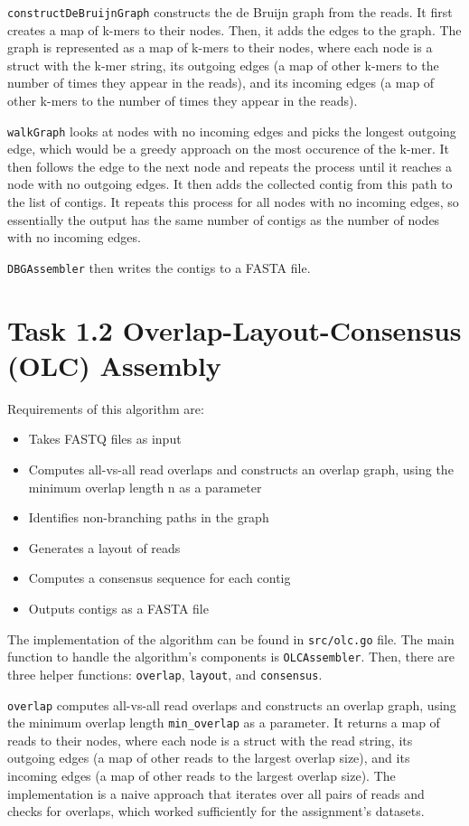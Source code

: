 \documentclass[12pt]{article}
\begin{document}
\texttt{constructDeBruijnGraph} constructs the de Bruijn graph from the reads. It first creates a map of k-mers to their nodes. Then, it adds the edges to the graph. The graph is represented as a map of k-mers to their nodes, where each node is a struct with the k-mer string, its outgoing edges (a map of other k-mers to the number of times they appear in the reads), and its incoming edges (a map of other k-mers to the number of times they appear in the reads).

\texttt{walkGraph} looks at nodes with no incoming edges and picks the longest outgoing edge, which would be a greedy approach on the most occurence of the k-mer. It then follows the edge to the next node and repeats the process until it reaches a node with no outgoing edges. It then adds the collected contig from this path to the list of contigs. It repeats this process for all nodes with no incoming edges, so essentially the output has the same number of contigs as the number of nodes with no incoming edges.

\texttt{DBGAssembler} then writes the contigs to a FASTA file.

\section{Task 1.2 Overlap-Layout-Consensus (OLC) Assembly}

Requirements of this algorithm are:
\begin{itemize}
    \item Takes FASTQ files as input
    \item Computes all-vs-all read overlaps and constructs an overlap graph,
    using the minimum overlap length n as a parameter
    \item Identifies non-branching paths in the graph
    \item Generates a layout of reads
    \item Computes a consensus sequence for each contig
    \item Outputs contigs as a FASTA file
\end{itemize}

The implementation of the algorithm can be found in \texttt{src/olc.go} file. The main function to handle the algorithm's components is \texttt{OLCAssembler}. Then, there are three helper functions: \texttt{overlap}, \texttt{layout}, and \texttt{consensus}.

\texttt{overlap} computes all-vs-all read overlaps and constructs an overlap graph, using the minimum overlap length \texttt{min\_overlap} as a parameter. It returns a map of reads to their nodes, where each node is a struct with the read string, its outgoing edges (a map of other reads to the largest overlap size), and its incoming edges (a map of other reads to the largest overlap size).
The implementation is a naive approach that iterates over all pairs of reads and checks for overlaps, which worked sufficiently for the assignment's datasets.
\end{document}
